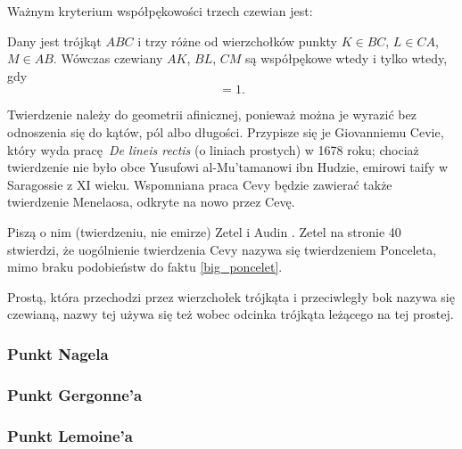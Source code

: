 %

Ważnym kryterium współpękowości trzech czewian jest:

\begin{theorem}[Cevy]
	Dany jest trójkąt $ABC$ i trzy różne od wierzchołków punkty $K \in BC$, $L \in CA$, $M \in AB$.
	Wówczas czewiany $AK$, $BL$, $CM$ są współpękowe wtedy i tylko wtedy, gdy
	\begin{equation}
		[AMB] [BKC] [CLA] = 1.
	\end{equation}
\end{theorem}

Twierdzenie należy do geometrii afinicznej, ponieważ można je wyrazić bez odnoszenia się do kątów, pól albo długości.
Przypisze się je Giovanniemu Cevie, który wyda pracę \emph{De lineis rectis} (o liniach prostych) w 1678 roku; chociaż twierdzenie nie było obce Yusufowi al-Mu'tamanowi ibn Hudzie, emirowi taify w Saragossie z XI wieku.
%
%
Wspomniana praca Cevy będzie zawierać także twierdzenie Menelaosa, odkryte na nowo przez Cevę.

Piszą o nim (twierdzeniu, nie emirze) Zetel \cite[s. 11-14, 40]{zetel_2020} i Audin \cite[s. 38]{audin_2003}.
Zetel na stronie 40 stwierdzi, że uogólnienie twierdzenia Cevy nazywa się twierdzeniem Ponceleta, mimo braku podobieństw do faktu \ref{big_poncelet}.

Prostą, która przechodzi przez wierzchołek trójkąta i przeciwległy bok nazywa się czewianą, nazwy tej używa się też wobec odcinka trójkąta leżącego na tej prostej.

\begin{proposition}
\end{proposition}

\subsubsection{Punkt Nagela}

\subsubsection{Punkt Gergonne'a}


\subsubsection{Punkt Lemoine'a}




%